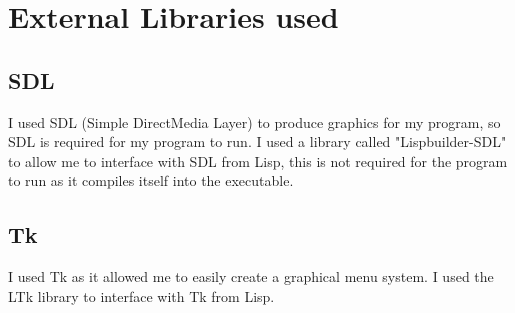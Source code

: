 \section{External Libraries used}
\subsection{SDL}
I used SDL (Simple DirectMedia Layer) to produce graphics for my program, so SDL
is required for my program to run. I used a library called "Lispbuilder-SDL" to
allow me to interface with SDL from Lisp, this is not required for the program
to run as it compiles itself into the executable.

\subsection{Tk}
I used Tk as it allowed me to easily create a graphical menu system. I used the
LTk library to interface with Tk from Lisp.
